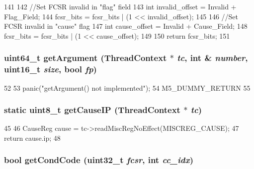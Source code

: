 \begin{DoxyCode}
141 {
142     //Set FCSR invalid in "flag" field
143     int invalid_offset = Invalid + Flag_Field;
144     fcsr_bits = fcsr_bits | (1 << invalid_offset);
145 
146     //Set FCSR invalid in "cause" flag
147     int cause_offset = Invalid + Cause_Field;
148     fcsr_bits = fcsr_bits | (1 << cause_offset);
149 
150     return fcsr_bits;
151 }
\end{DoxyCode}
\hypertarget{namespaceMipsISA_a3f9560369e934be05b1dd8f23fbd6104}{
\subsubsection[{getArgument}]{\setlength{\rightskip}{0pt plus 5cm}uint64\_\-t getArgument ({\bf ThreadContext} $\ast$ {\em tc}, \/  int \& {\em number}, \/  uint16\_\-t {\em size}, \/  bool {\em fp})}}
\label{namespaceMipsISA_a3f9560369e934be05b1dd8f23fbd6104}



\begin{DoxyCode}
52 {
53     panic("getArgument() not implemented\n");
54     M5_DUMMY_RETURN
55 }
\end{DoxyCode}
\hypertarget{namespaceMipsISA_a3967e2ee4f1bfc61ff1c2486d15d0abc}{
\subsubsection[{getCauseIP}]{\setlength{\rightskip}{0pt plus 5cm}static uint8\_\-t getCauseIP ({\bf ThreadContext} $\ast$ {\em tc})}}
\label{namespaceMipsISA_a3967e2ee4f1bfc61ff1c2486d15d0abc}



\begin{DoxyCode}
45                               {
46     CauseReg cause = tc->readMiscRegNoEffect(MISCREG_CAUSE);
47     return cause.ip;
48 }
\end{DoxyCode}
\hypertarget{namespaceMipsISA_a03ccbfe054e56369bcfef50d0e9e9284}{
\subsubsection[{getCondCode}]{\setlength{\rightskip}{0pt plus 5cm}bool getCondCode ({\bf uint32\_\-t} {\em fcsr}, \/  int {\em cc\_\-idx})}}
\label{namespaceMipsISA_a03ccbfe054e56369bcfef50d0e9e9284}



